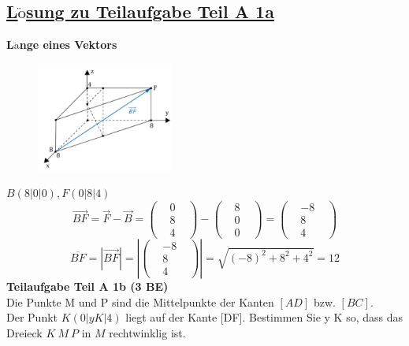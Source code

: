\documentclass[a4 paper, 12pt]{report}
\theoremstyle{plain}
\begin{document}
\subsection*{\underline{L$\ddot{\mbox{o}}$sung zu Teilaufgabe Teil A 1a}}
\textbf{L$\ddot{\mbox{a}}$nge eines Vektors}
\begin{figure}[h]
	\centering
		\includegraphics[width=0.40\textwidth]{image2.jpg}
	\label{fig:image2}
\end{figure}
\newpage
$B(8|0|0), F(0|8|4)$
$$
\stackrel{\longrightarrow}{BF} = \stackrel{\longrightarrow}{F} - \stackrel{\longrightarrow}{B} = 
\begin{pmatrix}
&0&\\
&8&\\
&4&
\end{pmatrix}
-
\begin{pmatrix}
&8&\\
&0&\\
&0&
\end{pmatrix}
= 
\begin{pmatrix}
&-8&\\
&8&\\
&4&
\end{pmatrix}
$$
$$
\overline{BF} = |\stackrel{\longrightarrow}{BF}| = \left|
\begin{pmatrix}
&-8&\\
&8&\\
&4&
\end{pmatrix}
\right| = \sqrt{(-8)^2+8^2+4^2}=12
$$
\textbf{\large{Teilaufgabe Teil A 1b (3 BE)}}\\
Die Punkte M und P sind die Mittelpunkte der Kanten $[AD]$ bzw. $[B C]$.\\
Der Punkt $K (0|y K |4)$ liegt auf der Kante [DF]. Bestimmen Sie y K so, dass das Dreieck $K~M~P$ in $M$ rechtwinklig ist.
\end{document}
